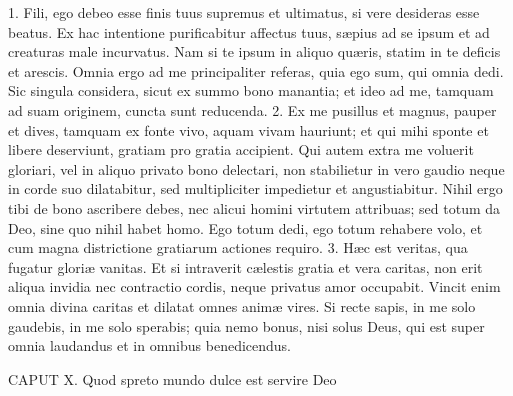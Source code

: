 \documentclass[twoside]{article}
\begin{document}
1. Fili, ego debeo esse finis tuus supremus et ultimatus, si vere desideras esse beatus. Ex hac intentione purificabitur affectus tuus, sæpius ad se ipsum et ad creaturas male incurvatus. Nam si te ipsum in aliquo quæris, statim in te deficis et arescis. Omnia ergo ad me principaliter referas, quia ego sum, qui omnia dedi. Sic singula considera, sicut ex summo bono manantia; et ideo ad me, tamquam ad suam originem, cuncta sunt reducenda.
2. Ex me pusillus et magnus, pauper et dives, tamquam ex fonte vivo, aquam vivam hauriunt; et qui mihi sponte et libere deserviunt, gratiam pro gratia accipient. Qui autem extra me voluerit gloriari, vel in aliquo privato bono delectari, non stabilietur in vero gaudio neque in corde suo dilatabitur, sed multipliciter impedietur et angustiabitur. Nihil ergo tibi de bono ascribere debes, nec alicui homini virtutem attribuas; sed totum da Deo, sine quo nihil habet homo. Ego totum dedi, ego totum rehabere volo, et cum magna districtione gratiarum actiones requiro.
3. Hæc est veritas, qua fugatur gloriæ vanitas. Et si intraverit cælestis gratia et vera caritas, non erit aliqua invidia nec contractio cordis, neque privatus amor occupabit. Vincit enim omnia divina caritas et dilatat omnes animæ vires. Si recte sapis, in me solo gaudebis, in me solo sperabis; quia nemo bonus, nisi solus Deus, qui est super omnia laudandus et in omnibus benedicendus.


CAPUT X.
Quod spreto mundo dulce est servire Deo
\end{document}
